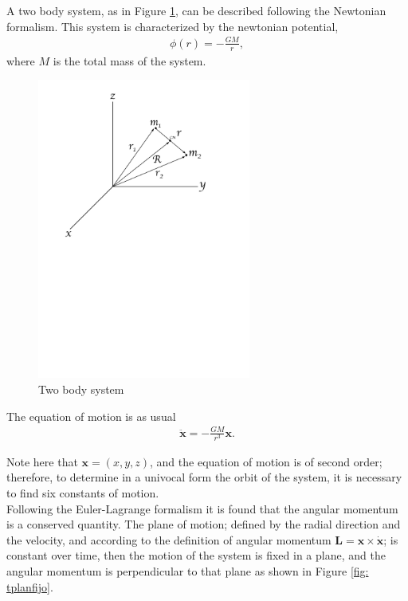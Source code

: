A two body system, as in Figure \ref{fig: twobodysystem}, can be described following the Newtonian formalism. This system is characterized by the newtonian potential,
\begin{align}
	\phi (r) = -\frac{GM}{r},
\end{align}
where $M$ is the total mass of the system.
\begin{figure}[htb!]
\centering
\includegraphics[width=7cm]{../Tesis/Capitulo0/Figures/Coordenadas.pdf}
\caption{Two body system}
\label{fig: twobodysystem}
\end{figure}

The equation of motion is as usual
\begin{align}
	\ddot{\mathbf{x}} = -\frac{GM}{r^3} \mathbf{x}.
	\label{eq: newtonianeqmotion}
\end{align}

Note here that $\mathbf{x} = (x,y,z)$, and the equation of motion is of second order; therefore, to determine in a univocal form the orbit of the system, it is necessary to find six constants of motion.\\

Following the Euler-Lagrange formalism it is found that the angular momentum is a conserved quantity. The plane of motion; defined by the radial direction and the velocity, and according to the definition of angular momentum $\mathbf{L} = \mathbf{x} \times \dot{\mathbf{x}}$; is constant over time, then the motion of the system is fixed in a plane, and the angular momentum is perpendicular to that plane as shown in Figure \ref{fig: tplanfijo}.\\

